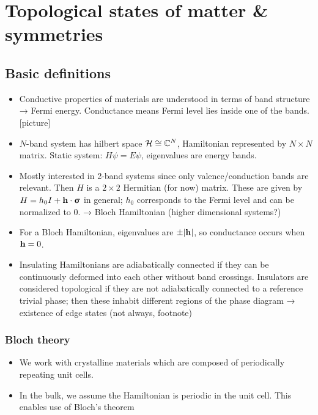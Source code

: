\chapter[Topological states of matter]{Topological states of matter \& symmetries}



\section{Basic definitions}
{\color{blue}
\begin{itemize}
	\item Conductive properties of materials are understood in terms of band structure → Fermi energy. Conductance means Fermi level lies inside one of the bands. [picture]
	
	\item $N$-band system has hilbert space $\mathcal{H}\cong\mathbb{C}^N$, Hamiltonian represented by $N\times N$ matrix. Static system: $H\psi = E\psi$, eigenvalues are energy bands.
	
	\item Mostly interested in 2-band systems since only valence/conduction bands are relevant. Then $H$ is a $2\times 2$ Hermitian (for now) matrix. These are given by $H = h_0I + \vb{h}\cdot\bm{\upsigma}$ in general; $h_0$ corresponds to the Fermi level and can be normalized to 0. → Bloch Hamiltonian (higher dimensional systems?)
	
	\item For a Bloch Hamiltonian, eigenvalues are $\pm\abs{\vb{h}}$, so conductance occurs when $\vb{h} = 0$.
	
	\item Insulating Hamiltonians are adiabatically connected if they can be continuously deformed into each other without band crossings. Insulators are considered topological if they are not adiabatically connected to a reference trivial phase; then these inhabit different regions of the phase diagram → existence of edge states (not always\cite{Bernevig_topological-insulators}, footnote)
\end{itemize}
}

\subsection{Bloch theory}
{\color{blue}
\begin{itemize}
	\item We work with crystalline materials which are composed of periodically repeating unit cells.
	
	\item In the bulk, we assume the Hamiltonian is periodic in the unit cell. This enables use of Bloch's theorem\cite{Bloch_theorem}
\end{itemize}
}


